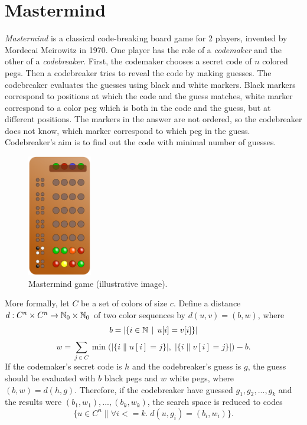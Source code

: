 \section{Mastermind}

\emph{Mastermind} is a classical code-breaking board game for 2 players,
  invented by Mordecai Meirowitz in 1970.
One player has the role of a \emph{codemaker} and the other of a \emph{codebreaker}.
First, the codemaker chooses a secret code of $n$ colored pegs.
Then a codebreaker tries to reveal the code by making guesses.
The codebreaker evaluates the guesses using black and white markers.
Black markers correspond to positions at which the code and the guess matches,
  white marker correspond to a color peg which is both in the code and the guess,
  but at different positions.
The markers in the answer are not ordered, so the codebreaker does not know,
  which marker correspond to which peg in the guess.
Codebreaker's aim is to find out the code with minimal number of guesses.

\begin{figure}
  \vspace{-10mm}
  \begin{center}
  \includegraphics[width=0.25\textwidth]{pictures/mastermind.png}
  \vspace{-5mm}
  \end{center}
  \caption{Mastermind game (illustrative image)\protect\footnotemark.}
  \vspace{15mm}
\end{figure}

More formally, let $C$ be a set of colors of size $c$.
Define a distance $d : C^n\times C^n -> \mathbb{N}_0\times\mathbb{N}_0$
  of two color sequences by $d(u, v) = (b, w)$, where
\[
b = |\{ i \in\mathbb{N} \:\:|\:\: u[i] = v[i] \}|
\]
\[
w = \sum_{j\in C} \min\big(\big|\{ i \| u[i] = j \}\big|,\;
                           \big|\{ i \| v[i] = j\}\big|\big)  - b.
\]
If the codemaker's secret code is $h$ and the codebreaker's guess is $g$,
  the guess should be evaluated with $b$ black pegs and $w$ white pegs, where
  $(b,w) = d(h,g)$.
Therefore, if the codebreaker have guessed $g_1, g_2, ..., g_k$ and the results
  were $(b_1,w_1), ..., (b_k, w_k)$,
  the search space is reduced to codes
  \[
  \{ u\in C^n \| \forall i<=k.\; d(u, g_i) = (b_i,w_i)\}.
  \]

